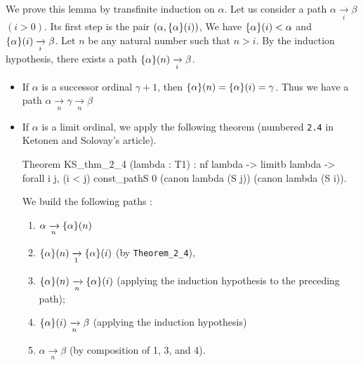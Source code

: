 We prove this lemma by transfinite induction on $\alpha$.
Let us consider a path $\alpha \xrightarrow [i]{} \beta$ $(i>0)$. Its first step is
the pair $(\alpha,\mbox{$\{\alpha\}(i)$})$, We have $\mbox{$\{\alpha\}(i)$}<\alpha$ and
$\mbox{$\{\alpha\}(i)$} \xrightarrow [i]{} \beta$. 
Let $n$ be any natural number such that $n>i$.
By the induction hypothesis, there exists a path $\mbox{$\{\alpha\}(n)$} \xrightarrow[i]{} \beta$.
\begin{itemize}
\item  If $\alpha$ is a successor ordinal $\gamma+1$, then $\mbox{$\{\alpha\}(n)$} =
\mbox{$\{\alpha\}(i)$}=\gamma$. Thus we have a path 
$\alpha  \xrightarrow [n]{}  \gamma \xrightarrow [n]{} \beta$
\item If $\alpha$ is a limit ordinal, we apply the following theorem (numbered \texttt{2.4} in Ketonen and Solovay's article). 



\begin{Coqsrc}
Theorem KS_thm_2_4 (lambda : T1) :
   nf lambda ->
   limitb lambda  ->
   forall i j, (i < j)%
               const_pathS 0 (canon lambda (S j))
                             (canon lambda (S i)).
\end{Coqsrc}

 We build the following paths :

 \begin{enumerate}
 \item $\alpha \xrightarrow[n]{} \mbox{$\{\alpha\}(n)$}$
 \item $\mbox{$\{\alpha\}(n)$} \xrightarrow[1]{} \mbox{$\{\alpha\}(i)$}$ (by \texttt{Theorem\_2\_4}),
\item $\mbox{$\{\alpha\}(n)$} \xrightarrow[n]{} \mbox{$\{\alpha\}(i)$}$ (applying the induction hypothesis to the preceding path);
\item $\mbox{$\{\alpha\}(i)$} \xrightarrow[n]{} \beta$ (applying the induction hypothesis)\item $\alpha \xrightarrow[n]{} \beta$ (by composition of 1, 3, and 4).


 \end{enumerate}


\end{itemize}





